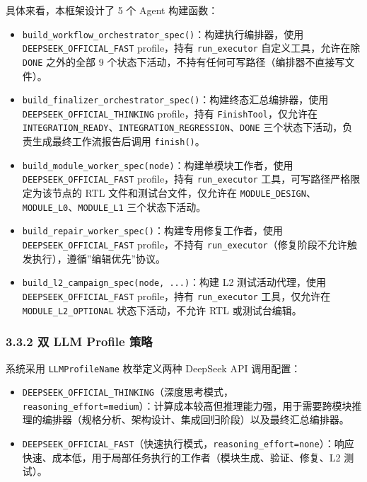具体来看，本框架设计了 5 个 Agent 构建函数：

\begin{itemize}
\tightlist
\item
  \texttt{build\_workflow\_orchestrator\_spec()}：构建执行编排器，使用
  \texttt{DEEPSEEK\_OFFICIAL\_FAST} profile，持有 \texttt{run\_executor}
  自定义工具，允许在除 \texttt{DONE} 之外的全部 9
  个状态下活动，不持有任何可写路径（编排器不直接写文件）。
\item
  \texttt{build\_finalizer\_orchestrator\_spec()}：构建终态汇总编排器，使用
  \texttt{DEEPSEEK\_OFFICIAL\_THINKING} profile，持有
  \texttt{FinishTool}，仅允许在
  \texttt{INTEGRATION\_READY}、\texttt{INTEGRATION\_REGRESSION}、\texttt{DONE}
  三个状态下活动，负责生成最终工作流报告后调用 \texttt{finish()}。
\item
  \texttt{build\_module\_worker\_spec(node)}：构建单模块工作者，使用
  \texttt{DEEPSEEK\_OFFICIAL\_FAST} profile，持有 \texttt{run\_executor}
  工具，可写路径严格限定为该节点的 RTL 文件和测试台文件，仅允许在
  \texttt{MODULE\_DESIGN}、\texttt{MODULE\_L0}、\texttt{MODULE\_L1}
  三个状态下活动。
\item
  \texttt{build\_repair\_worker\_spec()}：构建专用修复工作者，使用
  \texttt{DEEPSEEK\_OFFICIAL\_FAST} profile，不持有
  \texttt{run\_executor}（修复阶段不允许触发执行），遵循''编辑优先''协议。
\item
  \texttt{build\_l2\_campaign\_spec(node,\ ...)}：构建 L2
  测试活动代理，使用 \texttt{DEEPSEEK\_OFFICIAL\_FAST} profile，持有
  \texttt{run\_executor} 工具，仅允许在 \texttt{MODULE\_L2\_OPTIONAL}
  状态下活动，不允许 RTL 或测试台编辑。
\end{itemize}

\subsubsection{3.3.2 双 LLM Profile
策略}\label{ux53cc-llm-profile-ux7b56ux7565}

系统采用 \texttt{LLMProfileName} 枚举定义两种 DeepSeek API 调用配置：

\begin{itemize}
\tightlist
\item
  \texttt{DEEPSEEK\_OFFICIAL\_THINKING}（深度思考模式，\texttt{reasoning\_effort=\textquotesingle{}medium\textquotesingle{}}）：计算成本较高但推理能力强，用于需要跨模块推理的编排器（规格分析、架构设计、集成回归阶段）以及最终汇总编排器。
\item
  \texttt{DEEPSEEK\_OFFICIAL\_FAST}（快速执行模式，\texttt{reasoning\_effort=\textquotesingle{}none\textquotesingle{}}）：响应快速、成本低，用于局部任务执行的工作者（模块生成、验证、修复、L2
  测试）。
\end{itemize}

